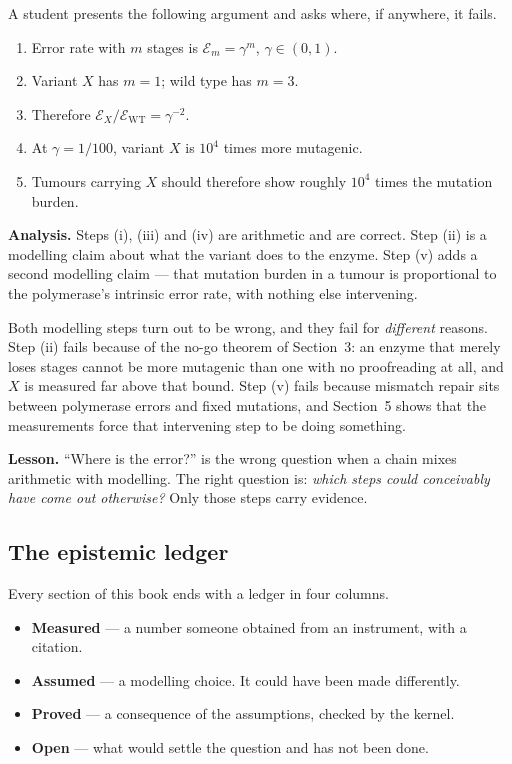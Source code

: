 \begin{worked}
A student presents the following argument and asks where, if anywhere, it fails.

\begin{enumerate}[label=(\roman*),leftmargin=*,itemsep=1pt]
  \item Error rate with $m$ stages is $\mathcal{E}_m = \gamma^m$, $\gamma \in (0,1)$.
  \item Variant $X$ has $m=1$; wild type has $m=3$.
  \item Therefore $\mathcal{E}_X/\mathcal{E}_{\mathrm{WT}} = \gamma^{-2}$.
  \item At $\gamma = 1/100$, variant $X$ is $10^4$ times more mutagenic.
  \item Tumours carrying $X$ should therefore show roughly $10^4$ times the mutation burden.
\end{enumerate}

\textbf{Analysis.} Steps (i), (iii) and (iv) are arithmetic and are correct. Step
(ii) is a modelling claim about what the variant does to the enzyme. Step (v) adds
a second modelling claim --- that mutation burden in a tumour is proportional to
the polymerase's intrinsic error rate, with nothing else intervening.

Both modelling steps turn out to be wrong, and they fail for \emph{different}
reasons. Step (ii) fails because of the no-go theorem of Section~3: an enzyme
that merely loses stages cannot be more mutagenic than one with no proofreading
at all, and $X$ is measured far above that bound. Step (v) fails because
mismatch repair sits between polymerase errors and fixed mutations, and
Section~5 shows that the measurements force that intervening step to be doing
something.

\textbf{Lesson.} ``Where is the error?'' is the wrong question when a chain mixes
arithmetic with modelling. The right question is: \emph{which steps could
conceivably have come out otherwise?} Only those steps carry evidence.
\end{worked}

\subsection{The epistemic ledger}

Every section of this book ends with a ledger in four columns.

\begin{itemize}[leftmargin=*,itemsep=1pt]
  \item \textbf{Measured} --- a number someone obtained from an instrument, with a citation.
  \item \textbf{Assumed} --- a modelling choice. It could have been made differently.
  \item \textbf{Proved} --- a consequence of the assumptions, checked by the kernel.
  \item \textbf{Open} --- what would settle the question and has not been done.
\end{itemize}


